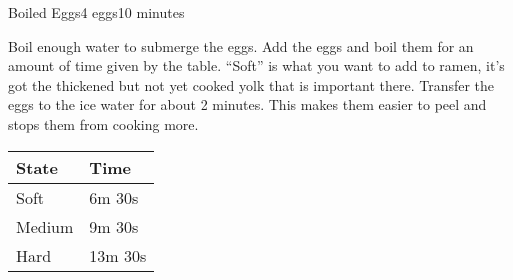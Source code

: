 \documentclass[../Cookbook.tex]{subfiles}
\begin{document}
\begin{recipe}[BoiledEggs]{Boiled Eggs}{4 eggs}{10 minutes}
	\begin{minipage}{0.6\textwidth}
		Boil enough water to submerge the eggs.
		Add the eggs and boil them for an amount of time given by the table.
		``Soft'' is what you want to add to ramen, it's got the thickened but not yet cooked yolk that is important there.
		Transfer the eggs to the ice water for about 2 minutes. This makes them easier to peel and stops them from cooking more.
	\end{minipage}
	\begin{minipage}{0.39\textwidth}
		\begin{tabular}{ll}
			\textbf{State} & \textbf{Time} \\ \hline
			Soft & 6m 30s \\
			Medium & 9m 30s \\
			Hard & 13m 30s
		\end{tabular}
	\end{minipage}
\end{recipe}
\end{document}
